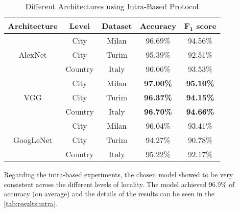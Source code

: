 \documentclass[journal]{IEEEtran}
\begin{document}
\begin{table}[h]
	\centering
	\caption{Different Architectures using Intra-Based Protocol}
	\label{tab:results:architectures}
	\begin{tabular}{ccccc}
		\toprule
		\textbf{Architecture}      & \textbf{Level} & \textbf{Dataset} & \textbf{Accuracy} & \textbf{$\bm{F_1}$ score} 	\\ \midrule
		\multirow{3}{*}{AlexNet}   & City    & Milan            & 96.69\%           & 94.56\%           	\\
		& City    & Turim            & 95.39\%           & 92.51\%           	\\
		& Country & Italy            & 96.06\%           & 93.53\%           	\\ \midrule
		\multirow{3}{*}{VGG}       & City    & Milan            & \textbf{97.00\%}  & \textbf{95.10\%}  	\\
		& City    & Turim            & \textbf{96.37\%}  & \textbf{94.15\%}  	\\
		& Country & Italy            & \textbf{96.70\%}  & \textbf{94.66\%}  	\\ \midrule
		\multirow{3}{*}{GoogLeNet} & City    & Milan            & 96.04\%           & 93.41\%           	\\
		& City    & Turim            & 94.27\%           & 90.78\%           	\\
		& Country & Italy            & 95.22\%           & 92.17\%           	\\ \bottomrule
	\end{tabular}
\end{table}

Regarding the intra-based experiments, the chosen model showed to be very consistent across the different levels of locality. The model achieved 96.9\% of accuracy (on average) and the details of the results can be seen in the \autoref{tab:results:intra}.
\end{document}
